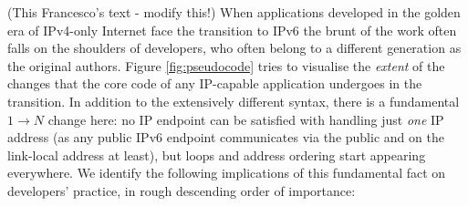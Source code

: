 (This Francesco's text - modify this!)
When applications developed in the golden
era of IPv4-only Internet face the transition to IPv6 the brunt of the
work often falls on the shoulders of developers, who often belong to a different
generation as the original authors. Figure \ref{fig:pseudocode} tries to
visualise the {\it extent} of the changes that the core code of any
IP-capable application undergoes in the transition. In addition to
the extensively different syntax, there is a
fundamental $1\rightarrow N$ change here:
no IP endpoint can be satisfied with handling just {\it one}
IP address (as any public IPv6 endpoint communicates via the
public and on the link-local address at least), but loops and address
ordering start appearing everywhere. We identify the following implications of this
fundamental fact on developers' practice, in rough descending order
of importance:
